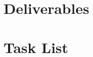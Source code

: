 \documentclass[
	letterpaper, %
]{jdf}
\begin{document}
\section{Deliverables}



\section{Task List}



\printbibliography{}
\end{document}
